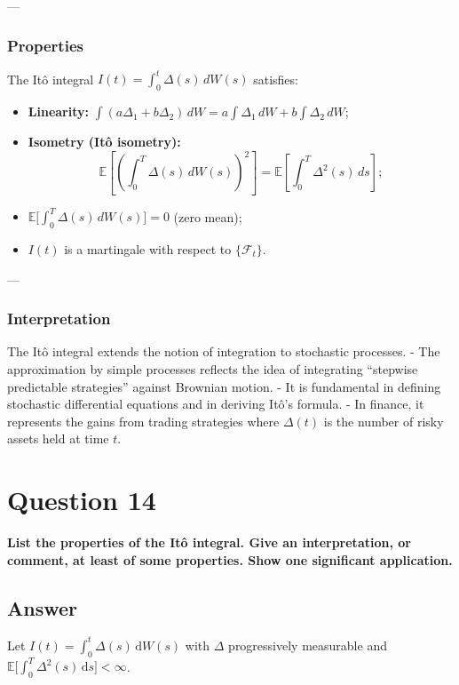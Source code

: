 \documentclass[12pt,a4paper]{book}
\theoremstyle{remark}
\newcommand{\EE}{\mathbb{E}}          %
\newcommand{\F}{\mathcal{F}}          %
\newcommand{\dd}{\mathrm{d}}
\begin{document}
---

\subsubsection*{Properties}
The Itô integral $I(t)=\int_0^t \Delta(s)\,dW(s)$ satisfies:
\begin{itemize}
    \item \textbf{Linearity:} $\int (a\Delta_1+b\Delta_2)\,dW = a\int\Delta_1\,dW + b\int\Delta_2\,dW$;
    \item \textbf{Isometry (Itô isometry):}
    \[
    \EE\!\left[\left(\int_0^T \Delta(s)\,dW(s)\right)^2\right] = \EE\!\left[\int_0^T \Delta^2(s)\,ds\right];
    \]
    \item $\EE\!\big[\int_0^T \Delta(s)\,dW(s)\big] = 0$ (zero mean);
    \item $I(t)$ is a martingale with respect to $\{\F_t\}$.
\end{itemize}

---

\subsubsection*{Interpretation}
The Itô integral extends the notion of integration to stochastic processes.  
- The approximation by simple processes reflects the idea of integrating “stepwise predictable strategies” against Brownian motion.  
- It is fundamental in defining stochastic differential equations and in deriving Itô’s formula.  
- In finance, it represents the gains from trading strategies where $\Delta(t)$ is the number of risky assets held at time $t$.







\newpage
\section{Question 14}
\textbf{List the properties of the It\^o integral. Give an interpretation, or comment, at least of some properties. Show one significant application.}

\subsection*{Answer}

Let $I(t)=\int_0^t \Delta(s)\,\dd W(s)$ with $\Delta$ progressively measurable and $\EE\!\big[\int_0^T \Delta^2(s)\,\dd s\big]<\infty$.
\end{document}
